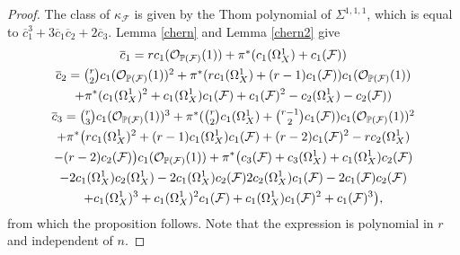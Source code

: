 \documentclass[10pt,a4paper]{amsart}
\begin{document}
\begin{proof} The class of $\kappa_\mathcal F$ is given by the Thom polynomial of $\Sigma^{1,1,1}$, which is equal to $\overline c_1^3+3\overline c_1\overline c_2+2\overline c_3$.  Lemma \ref{chern} and Lemma \ref{chern2} give 
\begin{multline*}
\textstyle \overline c_1=rc_1(\mathcal O_{\mathbb P(\mathcal F)}(1))+\pi^*(c_1(\Omega^1_X)+c_1(\mathcal F) )\\
\textstyle \overline c_2=\binom{r}2 c_1(\mathcal O_{\mathbb P(\mathcal F)}(1))^2+\pi^*(rc_1(\Omega^1_X)+(r-1)c_1(\mathcal F))c_1(\mathcal O_{\mathbb P(\mathcal F)}(1))\\
+\pi^*(c_1(\Omega^1_X)^2+c_1(\Omega^1_X)c_1(\mathcal F)+c_1(\mathcal F)^2
-c_2(\Omega^1_X)-c_2(\mathcal F))\\
\textstyle \overline c_3=\binom{r}3c_1(\mathcal O_{\mathbb P(\mathcal F)}(1))^3 +\pi^*(\binom{r}2 c_1(\Omega_X^1)+\binom{r-1}2 c_1(\mathcal F))c_1(\mathcal O_{\mathbb P(\mathcal F)}(1))^2 \\+\pi^*\bigl(rc_1(\Omega_X^1)^2+(r-1)c_1(\Omega_X^1)c_1(\mathcal F)
+(r-2)c_1(\mathcal F)^2-rc_2(\Omega_X^1)\\
-(r-2)c_2(\mathcal F)\bigr)c_1(\mathcal O_{\mathbb P(\mathcal F)}(1))
+\pi^*\bigl(c_3(\mathcal F)+c_3(\Omega_X^1)+c_1(\Omega_X^1)c_2(\mathcal F)\\
-2c_1(\Omega_X^1)c_2(\Omega_X^1)-2c_1(\Omega_X^1)c_2(\mathcal F)\-2c_2(\Omega_X^1)c_1(\mathcal F)
-2c_1(\mathcal F)c_2(\mathcal F)\\
+c_1(\Omega_X^1)^3+c_1(\Omega_X^1)^2c_1(\mathcal F)+c_1(\Omega_X^1)c_1(\mathcal F)^2+c_1(\mathcal F)^3\bigr),
\end{multline*}
from which the proposition follows. Note that the expression is polynomial in $r$ and independent of $n$.
\end{proof}
\end{document}
